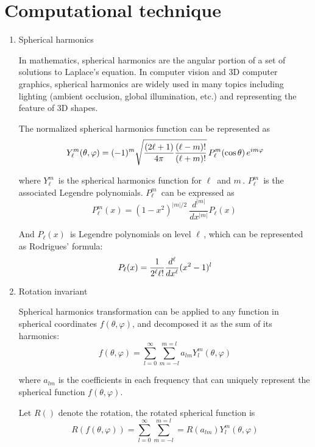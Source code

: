 \section{Computational technique}
\begin{enumerate}
\item Spherical harmonics

In mathematics, spherical harmonics are the angular portion of a set of solutions to Laplace's equation. In computer vision and 3D computer graphics, spherical harmonics are widely used in many topics including lighting (ambient occlusion, global illumination, etc.) and representing the feature of 3D shapes.

The normalized spherical harmonics function can be represented as 
\begin{equation} \label{spherical_harmonics}
    Y_\ell^m( \theta , \varphi ) = (-1)^m \sqrt{{(2\ell+1)\over 4\pi}{(\ell-m)!\over (\ell+m)!}} \, P_\ell^m ( \cos{\theta} ) \, e^{i m \varphi } 
\end{equation}

where $Y_\ell^m\,\!$ is the spherical harmonics function for $\ell\,\!$ and $m\,\!$. $P_\ell^m\,\!$ is the associated Legendre polynomials. $P_\ell^m\,\!$ can be expressed as 
\begin{equation} \label{legendre}
P_\ell^m(x) = (1 - x^2)^{|m|/2}\ \frac{d^{|m|}}{dx^{|m|}}P_\ell(x)\, 
\end{equation}

And $P_\ell(x)\,\!$ is Legendre polynomials on level $\ell\,\!$, which can be represented as Rodrigues' formula:
\begin{equation} \label{rodrigues}
P_\ell(x) = {1 \over 2^\ell \ell!} {d^\ell\over dx^\ell }(x^2 - 1)^l 
\end{equation}


\item Rotation invariant

Spherical harmonics transformation can be applied to any function in spherical coordinates $f(\theta,\varphi)$, and decomposed it as the sum of its harmonics:
\begin{equation} \label{sphericalfunction}
f(\theta,\varphi)=\sum_{l=0}^{\infty}\sum_{m=-l}^{m=l}a_{lm}Y_{l}^{m}(\theta,\varphi)
\end{equation}

where $a_{lm}$ is the coefficients in each frequency that can uniquely represent the spherical function $f(\theta,\varphi)$. 

Let $R()$ denote the rotation, the rotated spherical function is
\begin{equation} \label{rotatedfunction}
R(f(\theta,\varphi))=\sum_{l=0}^{\infty}\sum_{m=-l}^{m=l}=R(a_{lm})Y_{l}^{m}(\theta,\varphi)
\end{equation}


\end{enumerate}
